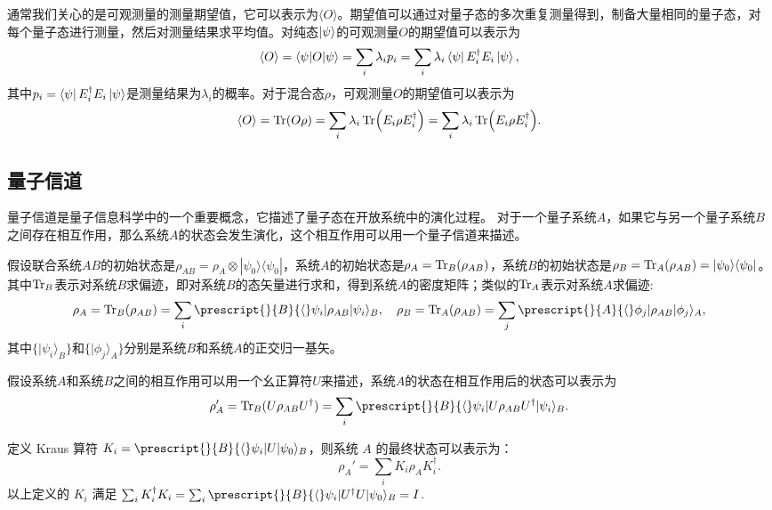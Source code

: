 通常我们关心的是可观测量的测量期望值，它可以表示为$\langle O \rangle$。期望值可以通过对量子态的多次重复测量得到，制备大量相同的量子态，对每个量子态进行测量，然后对测量结果求平均值。对纯态$\ket{\psi}$的可观测量$O$的期望值可以表示为
\begin{equation}
    \langle O \rangle = \langle \psi|O|\psi\rangle=\sum_i \lambda_i p_i=\sum_i \lambda_i \bra{\psi} E_i^\dagger E_i \ket{\psi},
\end{equation}
其中$p_i = \bra{\psi} E_i^\dagger E_i \ket{\psi}$是测量结果为$\lambda_i$的概率。对于混合态$\rho$，可观测量$O$的期望值可以表示为
\begin{equation}
    \langle O \rangle = \Tr(O\rho)=\sum_i \lambda_i \Tr(E_i\rho E_i^\dagger)=\sum_i \lambda_i \Tr(E_i\rho E_i^\dagger).
\end{equation}


\subsection{量子信道}
量子信道是量子信息科学中的一个重要概念，它描述了量子态在开放系统中的演化过程。
对于一个量子系统$A$，如果它与另一个量子系统$B$之间存在相互作用，那么系统$A$的状态会发生演化，这个相互作用可以用一个量子信道来描述。

假设联合系统$AB$的初始状态是$\rho_{AB} = \rho_A \otimes |\psi_0\rangle \langle \psi_0|$，系统$A$的初始状态是$\rho_A = \Tr_B(\rho_{AB})$，系统$B$的初始状态是$\rho_B = \Tr_A(\rho_{AB})=|\psi_0\rangle \langle \psi_0|$。
其中$\Tr_B$表示对系统$B$求偏迹，即对系统$B$的态矢量进行求和，得到系统$A$的密度矩阵；类似的$\Tr_A$表示对系统$A$求偏迹:
\begin{equation}
    \rho_A = \Tr_B(\rho_{AB}) = \sum_i \prescript{}{B}{\langle} \psi_i|\rho_{AB}|\psi_i\rangle_B, \quad \rho_B = \Tr_A(\rho_{AB}) = \sum_j \prescript{}{A}{\langle} \phi_j|\rho_{AB}|\phi_j\rangle_A,
\end{equation}
其中$\{|\psi_i\rangle_B\}$和$\{|\phi_j\rangle_A\}$分别是系统$B$和系统$A$的正交归一基矢。

假设系统$A$和系统$B$之间的相互作用可以用一个幺正算符$U$来描述，系统$A$的状态在相互作用后的状态可以表示为
\begin{equation}
    \rho_A' = \Tr_B(U\rho_{AB}U^\dagger) = \sum_i \prescript{}{B}{\langle} \psi_i|U\rho_{AB}U^\dagger|\psi_i\rangle_B.
\end{equation}

定义 Kraus 算符 $K_i = \prescript{}{B}{\langle} \psi_i|U|\psi_0\rangle_B$，则系统 $A$ 的最终状态可以表示为：
\begin{equation}
    \rho_A' = \sum_i K_i \rho_A K_i^\dagger.
\end{equation}
以上定义的 $K_i$ 满足 $\sum_i K_i^\dagger K_i = \sum_i \prescript{}{B}{\langle} \psi_i|U^\dagger U|\psi_0\rangle_B = I$.

